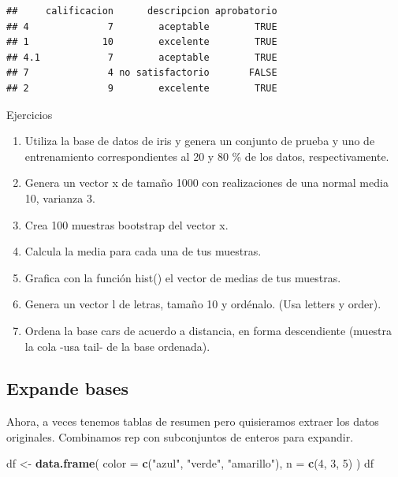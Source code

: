 \documentclass[]{article}
\newenvironment{Shaded}{\begin{snugshade}}{\end{snugshade}}
\newcommand{\KeywordTok}[1]{\textcolor[rgb]{0.13,0.29,0.53}{\textbf{{#1}}}}
\newcommand{\DataTypeTok}[1]{\textcolor[rgb]{0.13,0.29,0.53}{{#1}}}
\newcommand{\DecValTok}[1]{\textcolor[rgb]{0.00,0.00,0.81}{{#1}}}
\newcommand{\StringTok}[1]{\textcolor[rgb]{0.31,0.60,0.02}{{#1}}}
\newcommand{\NormalTok}[1]{{#1}}
\begin{document}
\begin{verbatim}
##     calificacion      descripcion aprobatorio
## 4              7        aceptable        TRUE
## 1             10        excelente        TRUE
## 4.1            7        aceptable        TRUE
## 7              4 no satisfactorio       FALSE
## 2              9        excelente        TRUE
\end{verbatim}

\renewcommand\bcStyleTitre[1]{\large\textcolor{bbblack}{#1}}

\begin{bclogo}[
  couleur=llred,
  arrondi=0,
  logo=\bcstop,
  barre=none,
  noborder=true]{Ejercicios}
\begin{enumerate}
\item Utiliza la base de datos de iris y genera un conjunto de prueba y uno de entrenamiento correspondientes al 20 y 80 \% de los datos, respectivamente.
\item Genera un vector x de tamaño 1000 con realizaciones de una normal media 10, varianza 3. 
\item Crea 100 muestras bootstrap del vector x.
\item Calcula la media para cada una de tus muestras.
\item Grafica con la función hist() el vector de medias de tus muestras.
\item Genera un vector l de letras, tamaño 10 y ordénalo. (Usa letters y order).
\item Ordena la base cars de acuerdo a distancia, en forma descendiente (muestra la cola -usa tail- de la base ordenada).
\end{enumerate}
\end{bclogo}

\subsection{Expande bases}\label{expande-bases}

Ahora, a veces tenemos tablas de resumen pero quisieramos extraer los
datos originales. Combinamos rep con subconjuntos de enteros para
expandir.

\begin{Shaded}
\begin{Highlighting}[]
\NormalTok{df <-}\StringTok{ }\KeywordTok{data.frame}\NormalTok{(}
  \DataTypeTok{color =} \KeywordTok{c}\NormalTok{(}\StringTok{"azul"}\NormalTok{, }\StringTok{"verde"}\NormalTok{, }\StringTok{"amarillo"}\NormalTok{),}
  \DataTypeTok{n =} \KeywordTok{c}\NormalTok{(}\DecValTok{4}\NormalTok{, }\DecValTok{3}\NormalTok{, }\DecValTok{5}\NormalTok{)}
\NormalTok{)}
\NormalTok{df}
\end{Highlighting}
\end{Shaded}
\end{document}

